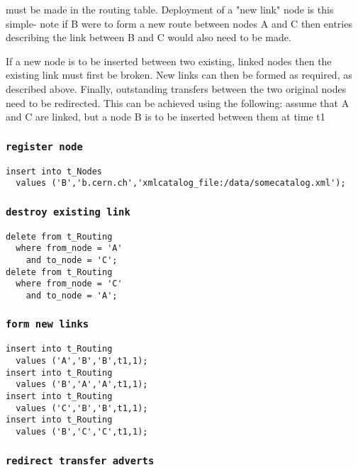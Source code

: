 \documentclass{cmspaper}
\begin{document}
must be made in the routing table. Deployment of a "new link" node is this simple- note if B were to form a new route between nodes A and C then entries describing the link between B and C would also need to be made.

If a new node is to be inserted between two existing, linked nodes then the existing link must first be broken. New links can then be formed as required, as described above. Finally, outstanding transfers between the two original nodes need to be redirected. This can be achieved using the following: assume that A and C are linked, but a node B is to be inserted between them at time t1

\subsubsection{\textbf{\texttt{register node}}}

{\small\begin{verbatim}
insert into t_Nodes
  values ('B','b.cern.ch','xmlcatalog_file:/data/somecatalog.xml');
\end{verbatim}}

\subsubsection{\textbf{\texttt{destroy existing link}}}

{\small\begin{verbatim}
delete from t_Routing
  where from_node = 'A'
    and to_node = 'C';
delete from t_Routing
  where from_node = 'C'
    and to_node = 'A';
\end{verbatim}}

\subsubsection{\textbf{\texttt{form new links}}}

{\small\begin{verbatim}
insert into t_Routing
  values ('A','B','B',t1,1);
insert into t_Routing
  values ('B','A','A',t1,1);
insert into t_Routing
  values ('C','B','B',t1,1);
insert into t_Routing
  values ('B','C','C',t1,1);
\end{verbatim}}

\subsubsection{\textbf{\texttt{redirect transfer adverts}}}
\end{document}
